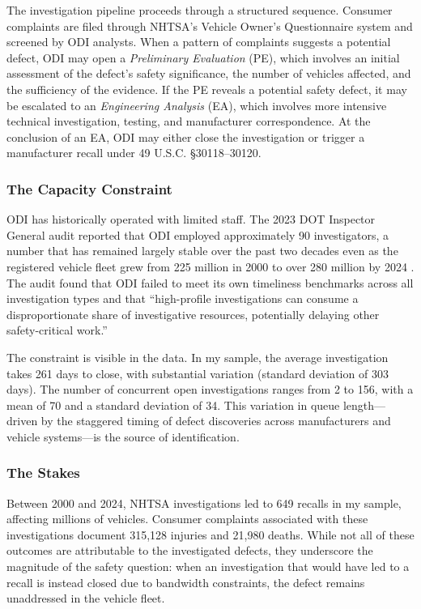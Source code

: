 \documentclass[12pt]{article}
\begin{document}
The investigation pipeline proceeds through a structured sequence. Consumer complaints are filed through NHTSA's Vehicle Owner's Questionnaire system and screened by ODI analysts. When a pattern of complaints suggests a potential defect, ODI may open a \textit{Preliminary Evaluation} (PE), which involves an initial assessment of the defect's safety significance, the number of vehicles affected, and the sufficiency of the evidence. If the PE reveals a potential safety defect, it may be escalated to an \textit{Engineering Analysis} (EA), which involves more intensive technical investigation, testing, and manufacturer correspondence. At the conclusion of an EA, ODI may either close the investigation or trigger a manufacturer recall under 49 U.S.C. \S 30118--30120.

\subsubsection*{The Capacity Constraint} ODI has historically operated with limited staff. The 2023 DOT Inspector General audit reported that ODI employed approximately 90 investigators, a number that has remained largely stable over the past two decades even as the registered vehicle fleet grew from 225 million in 2000 to over 280 million by 2024 \citep{dotig2023nhtsa, fhwa2024highway}. The audit found that ODI failed to meet its own timeliness benchmarks across all investigation types and that ``high-profile investigations can consume a disproportionate share of investigative resources, potentially delaying other safety-critical work.''

The constraint is visible in the data. In my sample, the average investigation takes 261 days to close, with substantial variation (standard deviation of 303 days). The number of concurrent open investigations ranges from 2 to 156, with a mean of 70 and a standard deviation of 34. This variation in queue length---driven by the staggered timing of defect discoveries across manufacturers and vehicle systems---is the source of identification.

\subsubsection*{The Stakes} Between 2000 and 2024, NHTSA investigations led to 649 recalls in my sample, affecting millions of vehicles. Consumer complaints associated with these investigations document 315,128 injuries and 21,980 deaths. While not all of these outcomes are attributable to the investigated defects, they underscore the magnitude of the safety question: when an investigation that would have led to a recall is instead closed due to bandwidth constraints, the defect remains unaddressed in the vehicle fleet.
\end{document}
